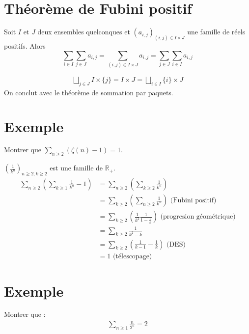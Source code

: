 \documentclass[../main.tex]{subfiles}
\begin{document}
\section{Théorème de Fubini positif}
\begin{tcolorbox}[title=Corollaire 35.16, title filled=false, colframe=orange, colback=orange!10!white]
    Soit $I$ et $J$ deux ensembles quelconques et $\left(a_{i, j}\right)_{(i, j) \in I \times J}$ une famille de réels positifs. Alors
    $$\sum_{i \in I} \sum_{j \in J} a_{i, j}=\sum_{(i, j) \in I \times J} a_{i, j}=\sum_{j \in J} \sum_{i \in I} a_{i, j}$$
\end{tcolorbox}

\begin{align*}
    \bigsqcup_{j\in J} I\times \{j\} = I\times J = \bigsqcup_{i\in I} \{i\} \times J
\end{align*}
On conclut avec le théorème de sommation par paquets. 

\section{Exemple}
\begin{tcolorbox}[title=Exemple 35.17, title filled=false, colframe=darkgreen, colback=darkgreen!10!white]
    Montrer que $\sum\limits_{n\geq 2} (\zeta(n)-1) = 1$. 
\end{tcolorbox}

\noindent $\left( \frac{1}{k^n} \right)_{n\geq 2, k\geq 2}$ est une famille de $\mathbb{R}_+$. 
\begin{align*}
    \sum_{n\geq 2} \left( \sum_{k\geq 1} \frac{1}{k^n} - 1 \right) &= \sum_{n\geq 2} \left( \sum_{k\geq 2} \frac{1}{k^n} \right) \\
    &= \sum_{k\geq 2} \left( \sum_{n\geq 2} \frac{1}{k^n} \right) \text{ (Fubini positif)} \\
    &= \sum_{k\geq 2} \left( \frac{1}{k^2} \frac{1}{1 - \frac{1}{k}} \right) \text{ (progresion géométrique)} \\
    &= \sum_{k\geq 2} \frac{1}{k^2 - k} \\
    &= \sum_{k\geq 2} \left( \frac{1}{k-1} - \frac{1}{k} \right) \text{ (DES)} \\
    &= 1 \text{ (télescopage)}
\end{align*}

\section{Exemple}
\begin{tcolorbox}[title=Exemple 35.18, title filled=false, colframe=darkgreen, colback=darkgreen!10!white]
    Montrer que :
    \begin{align*}
        \sum_{n\geq 1} \frac{n}{2^n} = 2
    \end{align*}
\end{tcolorbox}
\end{document}
